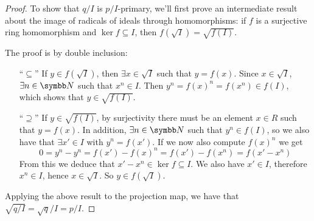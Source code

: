 \begin{problem*}{6}
\begin{enumerate}[(a)]
\begin{proof}
    To show that \(q/I\) is \(p/I\)-primary, we'll first prove an intermediate result about the image of radicals of ideals through homomorphisms: if \(f\) is a surjective ring homomorphism and \(\ker f \subseteq I\), then \(f\left(\sqrt{I}\right) = \sqrt{f(I)}\).
    
    The proof is by double inclusion:
    \begin{itemize}
        \item[``\(\subseteq\)''] If \(y \in f\left(\sqrt{I}\right)\), then \(\exists x \in \sqrt{I}\) such that \(y = f(x)\). Since \(x \in \sqrt{I}\), \(\exists n \in \naturals\) such that \(x^n \in I\). Then \(y^n = f(x)^n = f(x^n) \in f(I)\), which shows that \(y \in \sqrt{f(I)}\).
        
        \item[``\(\supseteq\)''] If \(y \in \sqrt{f(I)}\), by surjectivity there must be an element \(x \in R\) such that \(y = f(x)\). In addition, \(\exists n \in \naturals\) such that \(y^n \in f(I)\), so we also have that \(\exists x' \in I\) with \(y^n = f(x')\). If we now also compute \(f(x)^n\) we get
        \[
            0 = y^n - y^n = f(x') - f(x)^n = f(x') - f(x^n) = f(x' - x^n)
        \]
        From this we deduce that \(x' - x^n \in \ker f \subseteq I\). We also have \(x' \in I\), therefore \(x^n \in I\), hence \(x \in \sqrt{I}\). So \(y \in f\left(\sqrt{I}\right)\).
    \end{itemize}
    
    Applying the above result to the projection map, we have that \(\sqrt{q/I} = \sqrt{q}/I = p/I\).
    \end{proof}
\end{enumerate}
\end{problem*}
